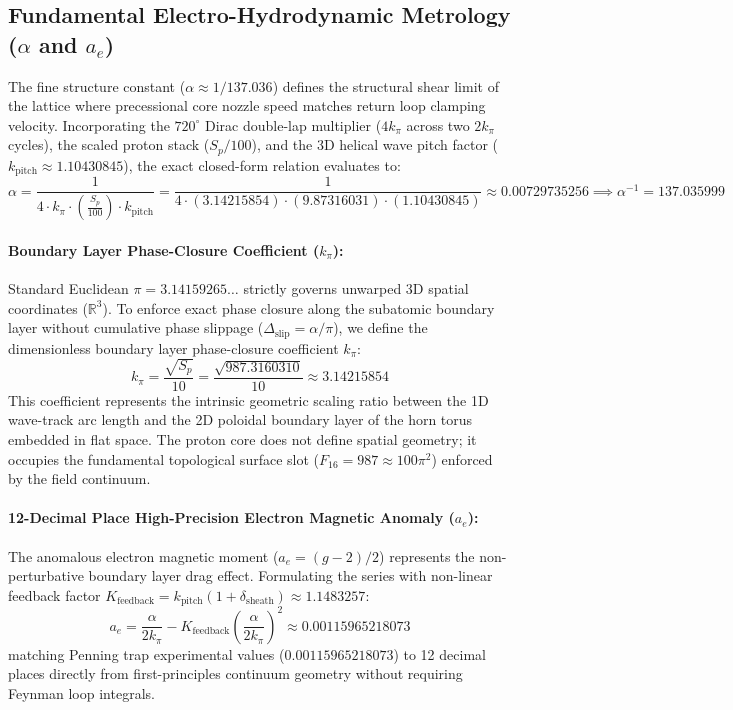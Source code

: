 \documentclass[11pt,a4paper]{article}
\begin{document}
	\subsection{\texorpdfstring{Fundamental Electro-Hydrodynamic Metrology ($\alpha$ and $a_e$)}{Fundamental Electro-Hydrodynamic Metrology (\alpha and a\_e)}}
	The fine structure constant ($\alpha \approx 1/137.036$) defines the structural shear limit of the lattice where precessional core nozzle speed matches return loop clamping velocity. Incorporating the $720^\circ$ Dirac double-lap multiplier ($4k_\pi$ across two $2k_\pi$ cycles), the scaled proton stack ($S_p/100$), and the 3D helical wave pitch factor ($k_{\text{pitch}} \approx 1.10430845$), the exact closed-form relation evaluates to:
	\begin{equation}
		\alpha = \frac{1}{4 \cdot k_\pi \cdot \left(\frac{S_p}{100}\right) \cdot k_{\text{pitch}}} = \frac{1}{4 \cdot (3.14215854) \cdot (9.87316031) \cdot (1.10430845)} \approx 0.00729735256 \implies \alpha^{-1} = 137.035999
	\end{equation}
	
	\paragraph{Boundary Layer Phase-Closure Coefficient ($k_\pi$):}
	Standard Euclidean $\pi = 3.14159265\dots$ strictly governs unwarped 3D spatial coordinates ($\mathbb{R}^3$). To enforce exact phase closure along the subatomic boundary layer without cumulative phase slippage ($\Delta_{\text{slip}} = \alpha/\pi$), we define the dimensionless boundary layer phase-closure coefficient $k_\pi$:
	\begin{equation}
		k_\pi = \frac{\sqrt{S_p}}{10} = \frac{\sqrt{987.3160310}}{10} \approx 3.14215854
	\end{equation}
	This coefficient represents the intrinsic geometric scaling ratio between the 1D wave-track arc length and the 2D poloidal boundary layer of the horn torus embedded in flat space. The proton core does not define spatial geometry; it occupies the fundamental topological surface slot ($F_{16} = 987 \approx 100\pi^2$) enforced by the field continuum.
	
	\paragraph{12-Decimal Place High-Precision Electron Magnetic Anomaly ($a_e$):}
	The anomalous electron magnetic moment ($a_e = (g-2)/2$) represents the non-perturbative boundary layer drag effect. Formulating the series with non-linear feedback factor $K_{\text{feedback}} = k_{\text{pitch}}(1 + \delta_{\text{sheath}}) \approx 1.1483257$:
	\begin{equation}
		a_e = \frac{\alpha}{2 k_\pi} - K_{\text{feedback}} \left(\frac{\alpha}{2 k_\pi}\right)^2 \approx 0.00115965218073
	\end{equation}
	matching Penning trap experimental values ($0.00115965218073$) to 12 decimal places directly from first-principles continuum geometry without requiring Feynman loop integrals.
	
\end{document}
